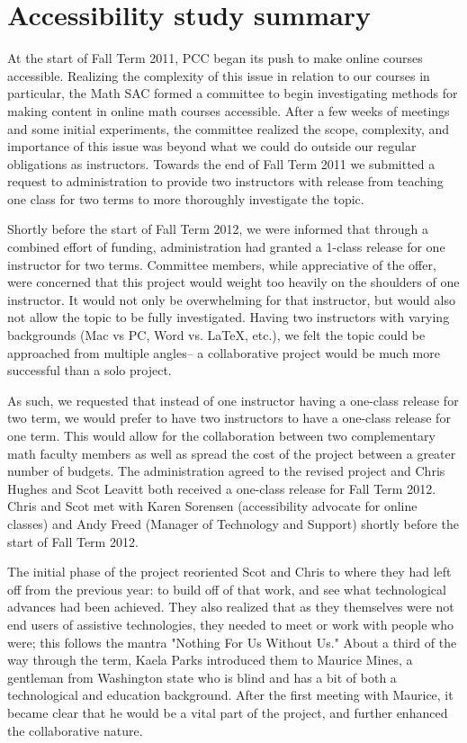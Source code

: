 \chapter{Accessibility study summary}\label{app:sec:accessibility}

At the start of Fall Term 2011, PCC began its push to make online courses accessible. 
Realizing the complexity of this issue in relation to our courses in particular, the Math SAC formed a
committee to begin investigating methods for making content in online math courses accessible. 
After a few weeks of meetings and some initial experiments, the committee realized the scope,
complexity, and importance of this issue was beyond what we could do outside our regular
obligations as instructors.  Towards the end of Fall Term 2011 we submitted a request to
administration to provide two instructors with release from teaching one class for two
terms to more thoroughly investigate the topic.

Shortly before the start of Fall Term 2012, we were informed that through a combined
effort of funding, administration had granted a 1-class release for one instructor for
two terms.  Committee members, while appreciative of the offer, were concerned that this
project would weight too heavily on the shoulders of one instructor.  It would not only be overwhelming for that
instructor, but would also not allow the topic to be fully investigated.  Having two
instructors with varying backgrounds (Mac vs PC, Word vs. LaTeX, etc.), we felt the
topic could be approached from multiple angles-- a collaborative project would
be much more successful than a solo project.

As such, we requested that instead of one instructor having a one-class release for two term, we would prefer to
have two instructors to have a one-class release for one term.  This would allow for the
collaboration between two complementary math faculty members as well as spread the cost of
the project between a greater number of budgets.  The administration agreed to the revised
project and Chris Hughes and Scot Leavitt both received a one-class release for Fall Term 2012. 
Chris and Scot met with Karen Sorensen (accessibility advocate for online classes) and Andy
Freed (Manager of Technology and Support) shortly before the start of Fall Term 2012.

The initial phase of the project reoriented Scot and Chris to where they had left off
from the previous year: to build off of that work, and see what technological advances
had been achieved. They also realized that as they themselves were not
end users of assistive technologies, they needed to meet or work with people who were; this
follows the mantra "Nothing For Us Without Us."  About a third of the way through the
term, Kaela Parks introduced them to Maurice Mines, a gentleman from Washington state who is
blind and has a bit of both a technological and education background.  After the first
meeting with Maurice, it became clear that he would be a vital part of the project, and further enhanced
the collaborative nature.

